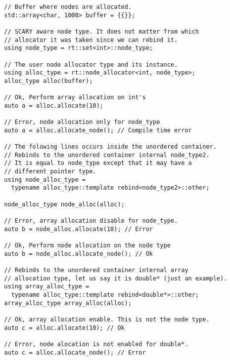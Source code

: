 \documentclass[11pt]{article}
\begin{document}
\medskip
\begin{lstlisting}
  // Buffer where nodes are allocated.
  std::array<char, 1000> buffer = {{}};

  // SCARY aware node type. It does not matter from which
  // allocator it was taken since we can rebind it.
  using node_type = rt::set<int>::node_type;

  // The user node allocator type and its instance.
  using alloc_type = rt::node_allocator<int, node_type>;
  alloc_type alloc(buffer);

  // Ok, Perform array allocation on int's
  auto a = alloc.allocate(10);

  // Error, node allocation only for node_type
  auto a = alloc.allocate_node(); // Compile time error

  // The folowing lines occurs inside the unordered container.
  // Rebinds to the unordered container internal node_type2.
  // It is equal to node_type except that it may have a
  // different pointer type.
  using node_alloc_type =
    typename alloc_type::template rebind<node_type2>::other;

  node_alloc_type node_alloc(alloc);

  // Error, array allocation disable for node_type.
  auto b = node_alloc.allocate(10); // Error

  // Ok, Perform node allocation on the node type
  auto b = node_alloc.allocate_node(); // Ok

  // Rebinds to the unordered container internal array
  // allocation type, let us say it is double* (just an example). 
  using array_alloc_type =
    typename alloc_type::template rebind<double*>::other;
  array_alloc_type array_alloc(alloc);

  // Ok, array allocation enable. This is not the node type.
  auto c = alloc.allocate(10); // Ok

  // Error, node alocation is not enabled for double*.
  auto c = alloc.allocate_node(); // Error
\end{lstlisting}
\end{document}
